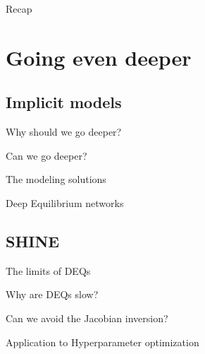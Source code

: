 \documentclass[aspectratio=169,xcolor=dvipsnames]{beamer}
\begin{document}
\begin{frame}{Recap}
\end{frame}

\section{Going even deeper}
\subsection{Implicit models}

\begin{frame}{Why should we go deeper?}
\end{frame}

\begin{frame}{Can we go deeper?}
\end{frame}

\begin{frame}{The modeling solutions}
\end{frame}

\begin{frame}{Deep Equilibrium networks}
\end{frame}

\subsection{SHINE}
\begin{frame}{The limits of DEQs}
\end{frame}

\begin{frame}{Why are DEQs slow?}
\end{frame}

\begin{frame}{Can we avoid the Jacobian inversion?}
\end{frame}

\begin{frame}{Application to Hyperparameter optimization}
\end{frame}
\end{document}
